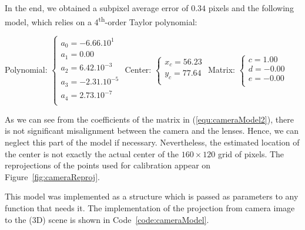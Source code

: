 In the end, we obtained a subpixel average error of $0.34$ pixels and the following model, which relies on a 4\textsuperscript{th}-order Taylor polynomial:\\
\begin{center}
Polynomial:
$
\begin{cases}
a_0 = -6.66 . 10^{1}\\ 
a_1 = 0.00 \\
a_2 = 6.42 . 10^{-3} \\
a_3 = -2.31 . 10^{-5} \\
a_4 = 2.73 . 10^{-7} \\
\end{cases}
$
\hfill
Center:
$
\begin{cases}
x_c = 56.23 \\
y_c = 77.64 \\
\end{cases}
$
\hfill
Matrix:
$
\begin{cases}
c = 1.00 \\
d = -0.00 \\
e = -0.00 \\
\end{cases}
$
\end{center}
As we can see from the coefficients of the matrix in (\ref{equ:cameraModel2}), there is not significant misalignment between the camera and the lenses. Hence, we can neglect this part of the model if necessary. Nevertheless, the estimated location of the center is not exactly the actual center of the $160 \times 120$ grid of pixels. The reprojections of the points used for calibration appear on Figure~\ref{fig:cameraReproj}. 

This model was implemented as a structure which is passed as parameters to any function that needs it. The implementation of the projection from camera image to the (3D) scene is shown in Code~\ref{code:cameraModel}.
\newpage

